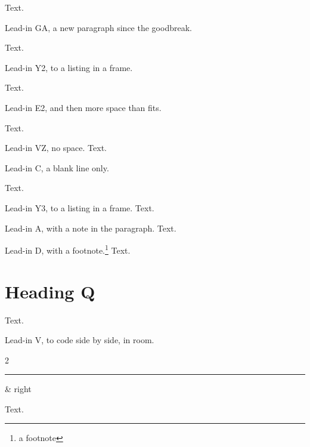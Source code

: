 Text.\goodbreak

Lead-in GA, a new paragraph since the goodbreak.\label{ga}
\begin{center}
\end{center}
Text.

Lead-in Y2, to a listing in a frame.\label{fr}

%
Text.

Lead-in E2, and then more space than fits.\label{ee}

\vspace{700pt}
Text.

Lead-in VZ, no space.\label{vz}
%
Text.

Lead-in C, a blank line only.\label{c}

Text.

Lead-in Y3, to a listing in a frame.\label{fs}
%
Text.

Lead-in A, with a note in the paragraph.\label{a}
Text.

Lead-in D, with a footnote.\label{d}\footnote{a footnote}
Text.

\section*{Heading Q\label{q}}
Text.

Lead-in V, to code side by side, in room.\label{v}
\begin{didacticpair}{2}
  \rule{1pt}{8\baselineskip}\label{vL} & right
\end{didacticpair}
Text.

